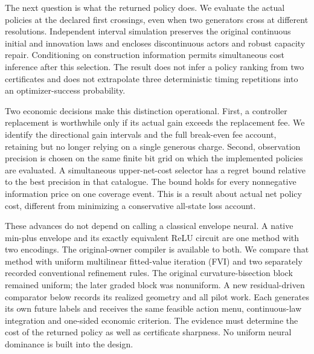 \documentclass[ecta,nameyear,draft]{econsocart}
\begin{document}
The next question is what the returned policy does. We evaluate the actual policies at the declared first crossings, even when two generators cross at different resolutions. Independent interval simulation preserves the original continuous initial and innovation laws and encloses discontinuous actors and robust capacity repair. Conditioning on construction information permits simultaneous cost inference after this selection. The result does not infer a policy ranking from two certificates and does not extrapolate three deterministic timing repetitions into an optimizer-success probability.

Two economic decisions make this distinction operational. First, a controller replacement is worthwhile only if its actual gain exceeds the replacement fee. We identify the directional gain intervals and the full break-even fee account, retaining but no longer relying on a single generous charge. Second, observation precision is chosen on the same finite bit grid on which the implemented policies are evaluated. A simultaneous upper-net-cost selector has a regret bound relative to the best precision in that catalogue. The bound holds for every nonnegative information price on one coverage event. This is a result about actual net policy cost, different from minimizing a conservative all-state loss account.

These advances do not depend on calling a classical envelope neural. A native min-plus envelope and its exactly equivalent ReLU circuit are one method with two encodings. The original-owner compiler is available to both. We compare that method with uniform multilinear fitted-value iteration (FVI) and two separately recorded conventional refinement rules. The original curvature-bisection block remained uniform; the later graded block was nonuniform. A new residual-driven comparator below records its realized geometry and all pilot work. Each generates its own future labels and receives the same feasible action menu, continuous-law integration and one-sided economic criterion. The evidence must determine the cost of the returned policy as well as certificate sharpness. No uniform neural dominance is built into the design.
\end{document}
